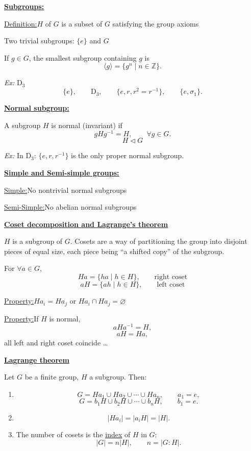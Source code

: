 \documentclass[11pt,a4paper]{article}
\newcommand{\D}{\mathrm{D}}
\begin{document}
\pagestyle{empty}

\underline{\textbf{Subgroups:}}

\underline{Definition:}\quad $H$ of $G$ is a subset of $G$ satisfying the group axioms

Two trivial subgroups: $\{e\}$ and $G$

If $g\in G$, the smallest subgroup containing $g$ is
\[
\langle g\rangle=\{g^n\mid n\in\mathbb{Z}\}.
\]

\emph{Ex:} $\D_3$
\[
\{e\},\qquad \D_3,\qquad \{e,r,r^2=r^{-1}\},\qquad \{e,\sigma_1\}.
\]

\underline{\textbf{Normal subgroup:}}

A subgroup $H$ is normal (invariant)
if
\[
gHg^{-1}=H,\qquad \forall g\in G.
\]
\[
\boxed{H\triangleleft G}
\]

\emph{Ex:} In $\D_3$: $\{e,r,r^{-1}\}$ is the only proper normal subgroup.

\underline{\textbf{Simple and Semi-simple groups:}}

\underline{Simple:}\quad No nontrivial normal subgroups

\underline{Semi-Simple:}\quad No abelian normal subgroups

\underline{\textbf{Coset decomposition and Lagrange's theorem}}

$H$ is a subgroup of $G$. Cosets are a way of partitioning the group into disjoint pieces of equal size, each piece being ``a shifted copy'' of the subgroup.

For $\forall a\in G$,
\[
Ha=\{ha\mid h\in H\},\qquad \text{right coset}
\]
\[
aH=\{ah\mid h\in H\},\qquad \text{left coset}
\]

\underline{Property:}\quad $Ha_i=Ha_j$ or $Ha_i\cap Ha_j=\varnothing$

\underline{Property:}\quad If $H$ is normal,
\[
aHa^{-1}=H,
\]
\[
aH=Ha,
\]
all left and right coset coincide \ldots

\begin{center}
\underline{\textbf{Lagrange theorem}}
\end{center}

Let $G$ be a finite group, $H$ a subgroup. Then:

\begin{enumerate}
\item
\[
G=Ha_1\cup Ha_2\cup\cdots\cup Ha_n,\qquad a_1=e,
\]
\[
G=b_1H\cup b_2H\cup\cdots\cup b_nH,\qquad b_1=e.
\]

\item
\[
|Ha_i|=|a_iH|=|H|.
\]

\item The number of cosets is the \underline{index} of $H$ in $G$:
\[
|G|=n|H|,
\qquad
n=|G:H|.
\]
\end{enumerate}
\end{document}
